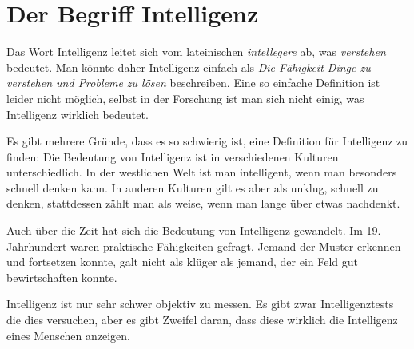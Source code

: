 \chapter{Der Begriff Intelligenz}

Das Wort Intelligenz leitet sich vom lateinischen \emph{intellegere} ab, was \emph{verstehen} bedeutet. Man könnte daher Intelligenz einfach als \emph{Die Fähigkeit Dinge zu verstehen und Probleme zu lösen} beschreiben.
Eine so einfache Definition ist leider nicht möglich, selbst in der Forschung ist man sich nicht einig, was Intelligenz wirklich bedeutet.

Es gibt mehrere Gründe, dass es so schwierig ist, eine Definition für Intelligenz zu finden:
Die Bedeutung von Intelligenz ist in verschiedenen Kulturen unterschiedlich. In der westlichen Welt ist man intelligent, wenn man besonders schnell denken kann. In anderen Kulturen gilt es aber als unklug, schnell zu denken, stattdessen zählt man als weise, wenn man lange über etwas nachdenkt.

Auch über die Zeit hat sich die Bedeutung von Intelligenz gewandelt. Im 19. Jahrhundert waren praktische Fähigkeiten gefragt. Jemand der Muster erkennen und fortsetzen konnte, galt nicht als klüger als jemand, der ein Feld gut bewirtschaften konnte.

Intelligenz ist nur sehr schwer objektiv zu messen. Es gibt zwar Intelligenztests die dies versuchen, aber es gibt Zweifel daran, dass diese wirklich die Intelligenz eines Menschen anzeigen.
